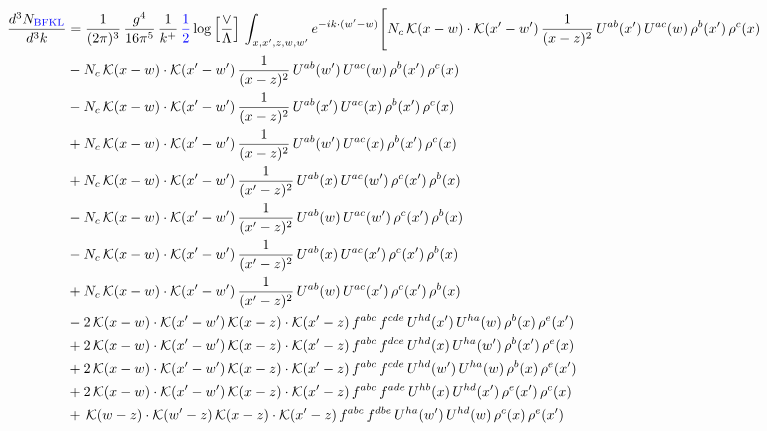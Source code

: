 \documentclass[9pt]{article}
\numberwithin{equation}{section}
\newcommand{\new}[1]{{\color{blue}#1}}
\begin{document}
\begin{align}
    \frac{d^{3}N_{\new{\mathrm{BFKL}}}}{d^{3}k} & = \frac{1}{(2\pi)^{3}}\,\frac{g^{4}}{16\pi^{5}}\,\frac{1}{k^{+}}\,\new{\frac{1}{2}}\log\Big[\frac{\vee}{\Lambda}\Big]\,\int_{x,x',z,w,w'}e^{-ik\cdot(w'-w)}\Bigg[N_{c}\,\mathcal{K}(x-w)\cdot\mathcal{K}(x'-w')\,\frac{1}{(x-z)^{2}}\,U^{ab}(x')\,U^{ac}(w)\,\rho^{b}(x')\,\rho^{c}(x)\notag\\
&-N_{c}\,\mathcal{K}(x-w)\cdot\mathcal{K}(x'-w')\,\frac{1}{(x-z)^{2}}\,U^{ab}(w')\,U^{ac}(w)\,\rho^{b}(x')\,\rho^{c}(x)\notag\\
&-N_{c}\,\mathcal{K}(x-w)\cdot\mathcal{K}(x'-w')\,\frac{1}{(x-z)^{2}}\,U^{ab}(x')\,U^{ac}(x)\,\rho^{b}(x')\,\rho^{c}(x)\notag\\
&+N_{c}\,\mathcal{K}(x-w)\cdot\mathcal{K}(x'-w')\,\frac{1}{(x-z)^{2}}\,U^{ab}(w')\,U^{ac}(x)\,\rho^{b}(x')\,\rho^{c}(x)\notag\\
&+N_{c}\,\mathcal{K}(x-w)\cdot\mathcal{K}(x'-w')\,\frac{1}{(x'-z)^{2}}\,U^{ab}(x)\,U^{ac}(w')\,\rho^{c}(x')\,\rho^{b}(x)\notag\\
&-N_{c}\,\mathcal{K}(x-w)\cdot\mathcal{K}(x'-w')\,\frac{1}{(x'-z)^{2}}\,U^{ab}(w)\,U^{ac}(w')\,\rho^{c}(x')\,\rho^{b}(x)\notag\\
&-N_{c}\,\mathcal{K}(x-w)\cdot\mathcal{K}(x'-w')\,\frac{1}{(x'-z)^{2}}\,U^{ab}(x)\,U^{ac}(x')\,\rho^{c}(x')\,\rho^{b}(x)\notag\\
&+N_{c}\,\mathcal{K}(x-w)\cdot\mathcal{K}(x'-w')\,\frac{1}{(x'-z)^{2}}\,U^{ab}(w)\,U^{ac}(x')\,\rho^{c}(x')\,\rho^{b}(x)\notag\\
&-2\,\mathcal{K}(x-w)\cdot\mathcal{K}(x'-w')\,\mathcal{K}(x-z)\cdot\mathcal{K}(x'-z)\,f^{abc}\,f^{cde}\,U^{hd}(x')\,U^{ha}(w)\,\rho^{b}(x)\,\rho^{e}(x')\notag\\
&+2\,\mathcal{K}(x-w)\cdot\mathcal{K}(x'-w')\,\mathcal{K}(x-z)\cdot\mathcal{K}(x'-z)\,f^{abc}\,f^{dce}\,U^{hd}(x)\,U^{ha}(w')\,\rho^{b}(x')\,\rho^{e}(x)\notag\\
&+2\,\mathcal{K}(x-w)\cdot\mathcal{K}(x'-w')\,\mathcal{K}(x-z)\cdot\mathcal{K}(x'-z)\,f^{abc}\,f^{cde}\,U^{hd}(w')\,U^{ha}(w)\,\rho^{b}(x)\,\rho^{e}(x')\notag\\
&+2\,\mathcal{K}(x-w)\cdot\mathcal{K}(x'-w')\,\mathcal{K}(x-z)\cdot\mathcal{K}(x'-z)\,f^{abc}\,f^{ade}\,U^{hb}(x)\,U^{hd}(x')\,\rho^{e}(x')\,\rho^{c}(x)\notag\\
&+\,\mathcal{K}(w-z)\cdot\mathcal{K}(w'-z)\,\mathcal{K}(x-z)\cdot\mathcal{K}(x'-z)\,f^{abc}\,f^{dbe}\,U^{ha}(w')\,U^{hd}(w)\,\rho^{c}(x)\,\rho^{e}(x')\notag\\

\end{align}
\end{document}
